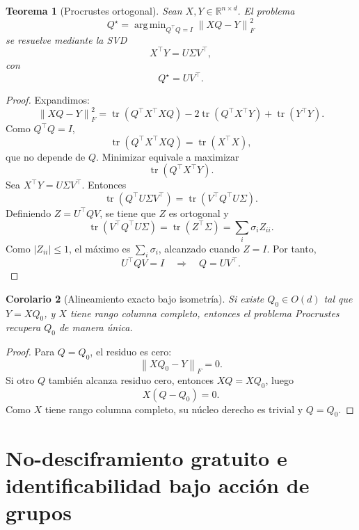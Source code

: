 \documentclass[11pt,a4paper]{article}
\newtheorem{theorem}{Teorema}[section]
\newtheorem{corollary}[theorem]{Corolario}
\DeclareMathOperator*{\argmin}{arg\,min}
\DeclareMathOperator{\tr}{tr}
\newcommand{\R}{\mathbb{R}}
\newcommand{\1}{\mathbf{1}}
\newcommand{\norm}[1]{\left\lVert #1 \right\rVert}
\numberwithin{equation}{section}
\begin{document}
\begin{theorem}[Procrustes ortogonal]
Sean \(X,Y\in\R^{n\times d}\). El problema
\begin{equation}
    Q^\star
    =
    \argmin_{Q^\top Q=I}
    \norm{XQ-Y}_F^2
    \label{eq:procrustes}
\end{equation}
se resuelve mediante la SVD
\begin{equation}
    X^\top Y=U\Sigma V^\top,
\end{equation}
con
\begin{equation}
    Q^\star=UV^\top.
\end{equation}
\end{theorem}

\begin{proof}
Expandimos:
\[
    \norm{XQ-Y}_F^2
    =
    \tr(Q^\top X^\top XQ)-2\tr(Q^\top X^\top Y)+\tr(Y^\top Y).
\]
Como \(Q^\top Q=I\),
\[
    \tr(Q^\top X^\top XQ)=\tr(X^\top X),
\]
que no depende de \(Q\). Minimizar equivale a maximizar
\[
    \tr(Q^\top X^\top Y).
\]
Sea \(X^\top Y=U\Sigma V^\top\). Entonces
\[
    \tr(Q^\top U\Sigma V^\top)
    =
    \tr(V^\top Q^\top U\Sigma).
\]
Definiendo \(Z=U^\top QV\), se tiene que \(Z\) es ortogonal y
\[
    \tr(V^\top Q^\top U\Sigma)=\tr(Z^\top \Sigma)=\sum_i \sigma_i Z_{ii}.
\]
Como \(|Z_{ii}|\leq 1\), el máximo es \(\sum_i\sigma_i\), alcanzado cuando \(Z=I\). Por tanto,
\[
    U^\top QV=I
    \quad\Rightarrow\quad
    Q=UV^\top.
\]
\end{proof}

\begin{corollary}[Alineamiento exacto bajo isometría]
Si existe \(Q_0\in O(d)\) tal que \(Y=XQ_0\), y \(X\) tiene rango columna completo, entonces el problema Procrustes recupera \(Q_0\) de manera única.
\end{corollary}

\begin{proof}
Para \(Q=Q_0\), el residuo es cero:
\[
    \norm{XQ_0-Y}_F=0.
\]
Si otro \(Q\) también alcanza residuo cero, entonces \(XQ=XQ_0\), luego
\[
    X(Q-Q_0)=0.
\]
Como \(X\) tiene rango columna completo, su núcleo derecho es trivial y \(Q=Q_0\).
\end{proof}

\section{No-desciframiento gratuito e identificabilidad bajo acción de grupos}
\label{sec:nofd}
\end{document}
